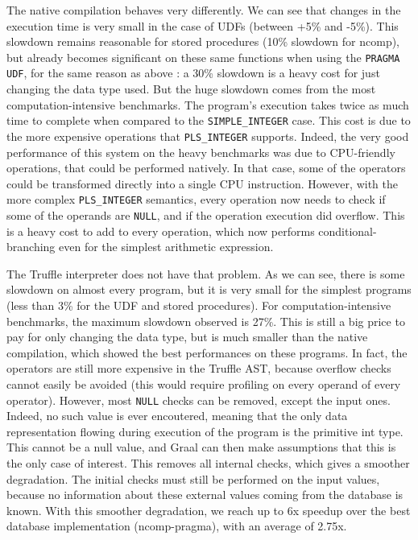 \documentclass[twoside,11pt,a4paper]{article}
\newcommand{\java}[1]{\textsf{#1}}
\newcommand{\pls}[1]{\texttt{#1}}
\newcommand{\plstype}[1]{\pls{#1}}
\newcommand{\plsi}{\plstype{PLS\_INTEGER}}
\newcommand{\simpleint}{\plstype{SIMPLE\_INTEGER}}
\newcommand{\plsnull}{\pls{NULL}}
\newcommand{\benchsystem}[1]{\textsf{#1}}
\newcommand{\ncomp}{\benchsystem{ncomp}}
\newcommand{\ncpg}{\benchsystem{ncomp-pragma}}
\begin{document}
The native compilation behaves very differently. We can see that changes in the execution time is very small in the case of UDFs (between +5\% and -5\%). This slowdown remains reasonable for stored procedures (10\% slowdown for \ncomp{}), but already becomes significant on these same functions when using the \pls{PRAGMA UDF}, for the same reason as above : a 30\% slowdown is a heavy cost for just changing the data type used. But the huge slowdown comes from the most computation-intensive benchmarks. The program's execution takes twice as much time to complete when compared to the \simpleint{} case. This cost is due to the more expensive operations that \plsi{} supports. Indeed, the very good performance of this system on the heavy benchmarks was due to CPU-friendly operations, that could be performed natively. In that case, some of the operators could be transformed directly into a single CPU instruction. However, with the more complex \plsi{} semantics, every operation now needs to check if some of the operands are \plsnull{}, and if the operation execution did overflow. This is a heavy cost to add to every operation, which now performs conditional-branching even for the simplest arithmetic expression.

The Truffle interpreter does not have that problem. As we can see, there is some slowdown on almost every program, but it is very small for the simplest programs (less than 3\% for the UDF and stored procedures). For computation-intensive benchmarks, the maximum slowdown observed is 27\%. This is still a big price to pay for only changing the data type, but is much smaller than the native compilation, which showed the best performances on these programs. In fact, the operators are still more expensive in the Truffle AST, because overflow checks cannot easily be avoided (this would require profiling on every operand of every operator). However, most \plsnull{} checks can be removed, except the input ones. Indeed, no such value is ever encoutered, meaning that the only data representation flowing during execution of the program is the primitive \java{int} type. This cannot be a null value, and Graal can then make assumptions that this is the only case of interest. This removes all internal checks, which gives a smoother degradation. The initial checks must still be performed on the input values, because no information about these external values coming from the database is known. With this smoother degradation, we reach up to 6x speedup over the best database implementation (\ncpg{}), with an average of 2.75x.
\end{document}
